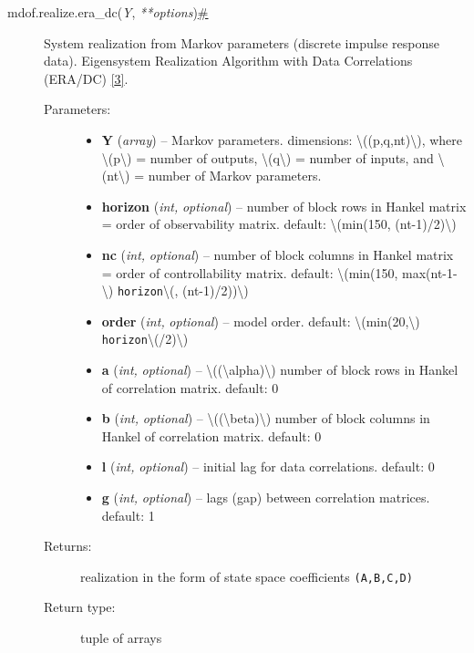 \begin{description}
\item[{ {{mdof.realize.}}{{era\_dc}}{(}\emph{{{Y}}},
\emph{{{**}}{{options}}}{)}\protect\hyperlink{mdof.realize.era_dc}{\#}}]
System realization from Markov parameters (discrete impulse response
data). Eigensystem Realization Algorithm with Data Correlations (ERA/DC)
\protect\hyperlink{id7}{{{[}}3{{]}}}.

\begin{description}
\item[Parameters{:}]
\begin{itemize}
\item
  \textbf{Y} (\emph{array}) -- Markov parameters. dimensions:
  {\textbackslash{}((p,q,nt)\textbackslash{})}, where
  {\textbackslash{}(p\textbackslash{})} = number of outputs,
  {\textbackslash{}(q\textbackslash{})} = number of inputs, and
  {\textbackslash{}(nt\textbackslash{})} = number of Markov parameters.
\item
  \textbf{horizon} (\emph{int,} \emph{optional}) -- number of block rows
  in Hankel matrix = order of observability matrix. default:
  {\textbackslash{}(min(150, (nt-1)/2)\textbackslash{})}
\item
  \textbf{nc} (\emph{int,} \emph{optional}) -- number of block columns
  in Hankel matrix = order of controllability matrix. default:
  {\textbackslash{}(min(150, max(nt-1-\textbackslash{})}
  \texttt{horizon}{\textbackslash{}(, (nt-1)/2))\textbackslash{})}
\item
  \textbf{order} (\emph{int,} \emph{optional}) -- model order. default:
  {\textbackslash{}(min(20,\textbackslash{})}
  \texttt{horizon}{\textbackslash{}(/2)\textbackslash{})}
\item
  \textbf{a} (\emph{int,} \emph{optional}) --
  {\textbackslash{}((\textbackslash{}alpha)\textbackslash{})} number of
  block rows in Hankel of correlation matrix. default: 0
\item
  \textbf{b} (\emph{int,} \emph{optional}) --
  {\textbackslash{}((\textbackslash{}beta)\textbackslash{})} number of
  block columns in Hankel of correlation matrix. default: 0
\item
  \textbf{l} (\emph{int,} \emph{optional}) -- initial lag for data
  correlations. default: 0
\item
  \textbf{g} (\emph{int,} \emph{optional}) -- lags (gap) between
  correlation matrices. default: 1
\end{itemize}
\item[Returns{:}]
realization in the form of state space coefficients \texttt{(A,B,C,D)}
\item[Return type{:}]
tuple of arrays
\end{description}


\end{description}
